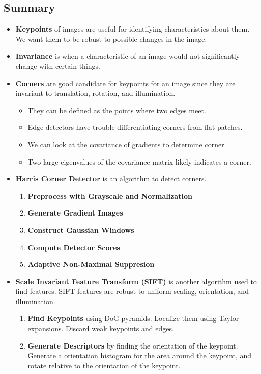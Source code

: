 \documentclass{article}
\begin{document}
\subsection{Summary}
\begin{itemize}
    \item \textbf{Keypoints} of images are useful for identifying characteristics about them. We want them to be robust to possible changes in the image.
    \item \textbf{Invariance} is when a characteristic of an image would not significantly change with certain things.
    \item \textbf{Corners} are good candidate for keypoints for an image since they are invariant to translation, rotation, and illumination.
    \begin{itemize}
        \item They can be defined as the points where two edges meet.
        \item Edge detectors have trouble differentiating corners from flat patches.
        \item We can look at the covariance of gradients to determine corner. 
        \item Two large eigenvalues of the covariance matrix likely indicates a corner. 
    \end{itemize}
    \item \textbf{Harris Corner Detector} is an algorithm to detect corners. 
    \begin{enumerate}
        \item \textbf{Preprocess with Grayscale and Normalization}
        \item \textbf{Generate Gradient Images}
        \item \textbf{Construct Gaussian Windows}
        \item \textbf{Compute Detector Scores}
        \item \textbf{Adaptive Non-Maximal Suppresion}
    \end{enumerate}
    \item \textbf{Scale Invariant Feature Transform (SIFT)} is another algorithm used to find features. SIFT features are robust to uniform scaling, orientation, and illumination. 
    \begin{enumerate}
        \item \textbf{Find Keypoints} using DoG pyramids. Localize them using Taylor expansions. Discard weak keypoints and edges.
        \item \textbf{Generate Descriptors} by finding the orientation of the keypoint. Generate a orientation histogram for the area around the keypoint, and rotate relative to the orientation of the keypoint. 

\end{enumerate}
\end{itemize}
\end{document}
